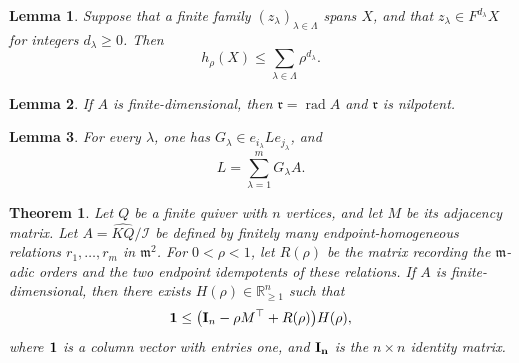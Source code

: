 \documentclass[10pt,a4paper]{amsart}
\newtheorem{theorem}{Theorem}
\newtheorem{lemma}{Lemma}
\newcommand{\one}{\mathbf 1}
\newcommand{\rA}{\mathfrak r}
\DeclareMathOperator{\rad}{rad}
\begin{document}
	\begin{lemma}
		\label{lemma:filtered-spanning}
		Suppose that a finite family $(z_\lambda)_{\lambda\in\Lambda}$ spans $X$,
		and that $z_\lambda\in F^{d_\lambda}X$ for integers $d_\lambda\geq0$.
		Then
		\[
		h_\rho(X)\leq\sum_{\lambda\in\Lambda}\rho^{d_\lambda}.
		\]
	\end{lemma}

	\begin{lemma}
		\label{lemma:radical}
		If $A$ is finite-dimensional, then $\rA=\rad A$ and $\rA$ is nilpotent.
	\end{lemma}

	\begin{lemma}
		\label{lemma:kernel-generators}
		For every $\lambda$, one has
		$G_\lambda\in e_{i_\lambda}Le_{j_\lambda}$, and
		\begin{equation*}
			L=\sum_{\lambda=1}^mG_\lambda A.
		\end{equation*}
	\end{lemma}

	\begin{theorem}
		\label{theorem:completed-matrix-gs}
Let $Q$ be a finite quiver with $n$ vertices, and let $M$ be its
adjacency matrix. Let
$A=\widehat{KQ}/\mathcal I$ be defined by finitely many
endpoint-homogeneous relations $r_1,\ldots,r_m$ in
$\mathfrak m^2$.
For $0<\rho<1$, let $R(\rho)$ be
		the matrix recording the $\mathfrak m$-adic orders and the two endpoint
		idempotents of these relations.  If $A$ is finite-dimensional, then there
		exists $H(\rho)\in\mathbb R_{\geq1}^{n}$ such that
		\begin{equation}
			\label{eq:completed-matrix-gs}
			\one\leq
			\bigl({\bf I}_{n}-\rho M^{\top}+R(\rho)\bigr)H(\rho),
		\end{equation}
		where $\bf 1$ is a column vector with entries one, and $\bf I_n$ is the $n\times n$ identity matrix. 
	\end{theorem}
\end{document}
